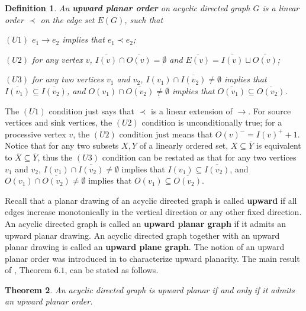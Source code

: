 \documentclass[11pt,a4paper]{article}
\newtheorem{thm}{Theorem}
\newtheorem{defn}[thm]{Definition}
\begin{document}
\begin{defn}\label{upo}
An \textbf{upward planar order} on acyclic directed graph $G$ is a linear order $\prec$ on the edge set $E(G)$, such that

$(U1)$ $e_1\to e_2$ implies that $e_1\prec e_2$;

$(U2)$ for any vertex $v$, $\overline{I(v)}\cap \overline{O(v)}=\emptyset$ and $\overline{E(v)}=\overline{I(v)}\sqcup \overline{O(v)}$;

$(U3)$ for any two  vertices $v_1$ and $v_2$, $I(v_1)\cap \overline{I(v_2)}\neq\emptyset$ implies that $\overline{I(v_1)}\subseteq \overline{I(v_2)}$, and $O(v_1)\cap \overline{O(v_2)}\neq\emptyset$ implies that $\overline{O(v_1)}\subseteq \overline{O(v_2)}$.
\end{defn}
The $(U1)$ condition just says that $\prec$ is a linear extension of $\to$. For source vertices and sink vertices, the $(U2)$ condition is unconditionally true; for a processive vertex $v$, the $(U2)$ condition just means that $O(v)^-=I(v)^++1$.
Notice that for any two subsets $X, Y$ of a linearly ordered set, $X\subseteq \overline{Y}$ is equivalent to $\overline{X}\subseteq \overline{Y}$, thus the $(U3)$ condition can be restated as that for any two  vertices $v_1$ and $v_2$, $I(v_1)\cap \overline{I(v_2)}\neq\emptyset$ implies that $I(v_1)\subseteq \overline{I(v_2)}$, and $O(v_1)\cap \overline{O(v_2)}\neq\emptyset$ implies that $O(v_1)\subseteq \overline{O(v_2)}$.

Recall that a planar drawing of an acyclic directed graph is called \textbf{upward} if all edges increase monotonically in the vertical direction or any other fixed direction. An acyclic directed graph is called an \textbf{upward planar graph} if it admits an upward planar drawing. An acyclic directed graph together with an upward planar drawing is called an \textbf{upward plane graph}.
The notion of an upward planar order was introduced in \cite{[LY16]} to characterize upward planarity.
The main result of  \cite{[LY16]}, Theorem $6.1$, can be stated as follows.

\begin{thm}
An acyclic directed graph is upward planar  if and only if it admits an upward planar order.
\end{thm}
\end{document}
